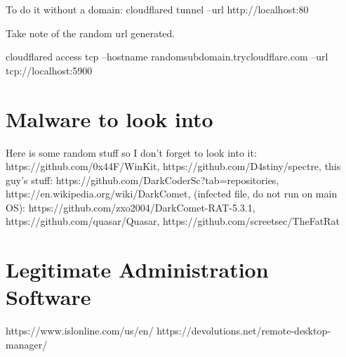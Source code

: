 \documentclass{article}
\begin{document}
To do it without a domain: cloudflared tunnel --url http://localhost:80

Take note of the random url generated.

cloudflared access tcp --hostname randomsubdomain.trycloudflare.com --url tcp://localhost:5900

\section{Malware to look into}
Here is some random stuff so I don't forget to look into it:
https://github.com/0x44F/WinKit, https://github.com/D4stiny/spectre, this guy's stuff: https://github.com/DarkCoderSc?tab=repositories,
https://en.wikipedia.org/wiki/DarkComet, (infected file, do not run on main OS): https://github.com/zxo2004/DarkComet-RAT-5.3.1,
https://github.com/quasar/Quasar, https://github.com/screetsec/TheFatRat

\section{Legitimate Administration Software}
https://www.islonline.com/us/en/
https://devolutions.net/remote-desktop-manager/
\end{document}
